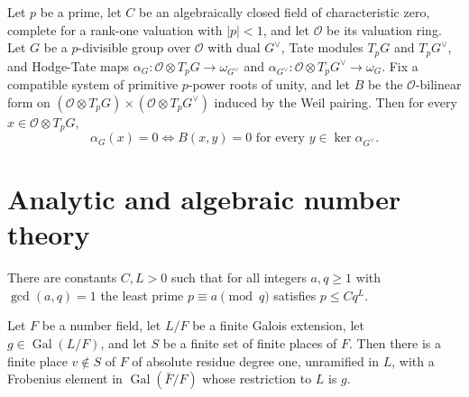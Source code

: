 \begin{theorem}\label{lit-hodge-tate-sequence}
Let $p$ be a prime, let $C$ be an algebraically closed field of
characteristic zero, complete for a rank-one valuation with $|p|<1$, and let
$\mathcal O$ be its valuation ring. Let $G$ be a $p$-divisible group over
$\mathcal O$ with dual $G^\vee$, Tate modules $T_pG$ and $T_pG^\vee$, and
Hodge-Tate maps
$\alpha_G:\mathcal O\otimes T_pG\to\omega_{G^\vee}$ and
$\alpha_{G^\vee}:\mathcal O\otimes T_pG^\vee\to\omega_G$. Fix a compatible
system of primitive $p$-power roots of unity, and let $B$ be the
$\mathcal O$-bilinear form on $(\mathcal O\otimes T_pG)\times
(\mathcal O\otimes T_pG^\vee)$ induced by the Weil pairing. Then for every
$x\in\mathcal O\otimes T_pG$,
\[
\alpha_G(x)=0\iff B(x,y)=0\text{ for every }y\in\ker\alpha_{G^\vee}.
\]
\end{theorem}

\section{Analytic and algebraic number theory}\label{section-lit-number-theory}

\begin{theorem}\label{lit-linnik}
There are constants $C,L>0$ such that for all integers $a,q\ge1$ with
$\gcd(a,q)=1$ the least prime $p\equiv a\pmod q$ satisfies $p\le Cq^L$.
\end{theorem}

\begin{theorem}\label{lit-chebotarev-degree-one}
Let $F$ be a number field, let $L/F$ be a finite Galois extension, let
$g\in\operatorname{Gal}(L/F)$, and let $S$ be a finite set of finite places
of $F$. Then there is a finite place $v\notin S$ of $F$ of absolute residue
degree one, unramified in $L$, with a Frobenius element in
$\operatorname{Gal}(\bar F/F)$ whose restriction to $L$ is $g$.
\end{theorem}


